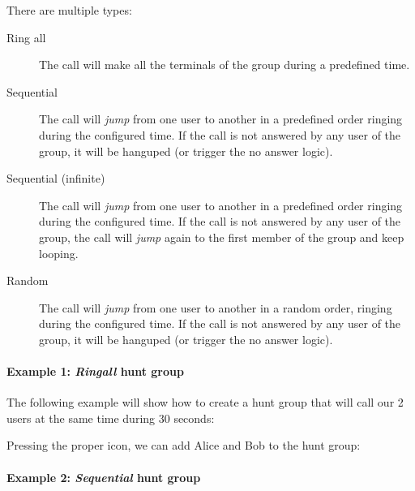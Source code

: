\documentclass[letterpaper,10pt,english]{sphinxmanual}
\begin{document}
There are multiple types:
\begin{description}
\item[{Ring all}] \leavevmode{}\label{company/huntgroups:term-ring-all}
The call will make all the terminals of the group during a predefined
time.

\item[{Sequential}] \leavevmode{}\label{company/huntgroups:term-sequential}
The call will \emph{jump} from one user to another in a predefined order
ringing during the configured time. If the call is not answered by any
user of the group, it will be hanguped (or trigger the no answer logic).

\item[{Sequential (infinite)}] \leavevmode{}\label{company/huntgroups:term-sequential-infinite}
The call will \emph{jump} from one user to another in a predefined order
ringing during the configured time. If the call is not answered by any
user of the group, the call will \emph{jump} again to the first member of the
group and keep looping.

\item[{Random}] \leavevmode{}\label{company/huntgroups:term-random}
The call will \emph{jump} from one user to another in a random order,
ringing during the configured time.  If the call is not answered by any
user of the group, it will be hanguped (or trigger the no answer logic).

\end{description}
\paragraph{Example 1: \emph{Ringall} hunt group}

The following example will show how to create a hunt group that will call our 2
users at the same time during 30 seconds:

\noindent{}

Pressing the proper icon, we can add Alice and Bob to the hunt group:

\noindent{}
\paragraph{Example 2: \emph{Sequential} hunt group}
\end{document}
